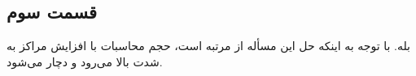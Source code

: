 \subsection{قسمت سوم}
بله. با توجه به اینکه حل این مسأله از مرتبه  است، حجم محاسبات با افزایش مراکز به شدت بالا می‌رود و دچار 
می‌شود.